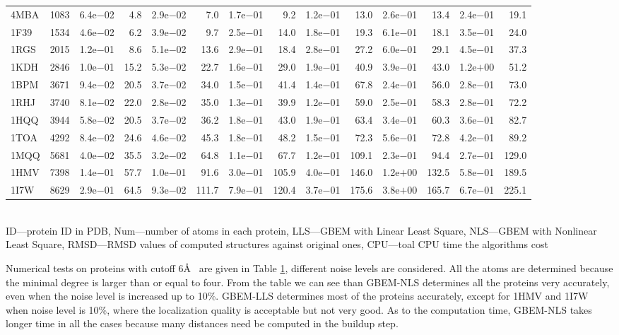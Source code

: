 \documentclass[a4paper,12pt]{article}
\begin{document}
\begin{table}[htb!]
{\begin{tabular}{lrrrrrrrrrrrrr}
  4MBA & 1083 & 6.4e$-$02 &  4.8 & 2.9e$-$02 &   7.0 & 1.7e$-$01 &   9.2 & 1.2e$-$01&  13.0 & 2.6e$-$01 &  13.4 & 2.4e$-$01&  19.1  \\
  1F39 & 1534 & 4.6e$-$02 &  6.2 & 3.9e$-$02 &   9.7 & 2.5e$-$01 &  14.0 & 1.8e$-$01&  19.3 & 6.1e$-$01 &  18.1 & 3.5e$-$01&  24.0  \\
  1RGS & 2015 & 1.2e$-$01 &  8.6 & 5.1e$-$02 &  13.6 & 2.9e$-$01 &  18.4 & 2.8e$-$01&  27.2 & 6.0e$-$01 &  29.1 & 4.5e$-$01&  37.3  \\
  1KDH & 2846 & 1.0e$-$01 & 15.2 & 5.3e$-$02 &  22.7 & 1.6e$-$01 &  29.0 & 1.9e$-$01&  40.9 & 3.9e$-$01 &  43.0 & 1.2e$+$00&  51.2  \\
  1BPM & 3671 & 9.4e$-$02 & 20.5 & 3.7e$-$02 &  34.0 & 1.5e$-$01 &  41.4 & 1.4e$-$01&  67.8 & 2.4e$-$01 &  56.0 & 2.8e$-$01&  73.0  \\
  1RHJ & 3740 & 8.1e$-$02 & 22.0 & 2.8e$-$02 &  35.0 & 1.3e$-$01 &  39.9 & 1.2e$-$01&  59.0 & 2.5e$-$01 &  58.3 & 2.8e$-$01&  72.2  \\
  1HQQ & 3944 & 5.8e$-$02 & 20.5 & 3.7e$-$02 &  36.2 & 1.8e$-$01 &  43.0 & 1.9e$-$01&  63.4 & 3.4e$-$01 &  60.3 & 3.6e$-$01&  82.7  \\
  1TOA & 4292 & 8.4e$-$02 & 24.6 & 4.6e$-$02 &  45.3 & 1.8e$-$01 &  48.2 & 1.5e$-$01&  72.3 & 5.6e$-$01 &  72.8 & 4.2e$-$01&  89.2  \\
  1MQQ & 5681 & 4.0e$-$02 & 35.5 & 3.2e$-$02 &  64.8 & 1.1e$-$01 &  67.7 & 1.2e$-$01& 109.1 & 2.3e$-$01 &  94.4 & 2.7e$-$01& 129.0  \\
  1HMV & 7398 & 1.4e$-$01 & 57.7 & 1.0e$-$01 &  91.6 & 3.0e$-$01 & 105.9 & 4.0e$-$01& 146.0 & 1.2e$+$00 & 132.5 & 5.8e$-$01& 189.5  \\
  1I7W & 8629 & 2.9e$-$01 & 64.5 & 9.3e$-$02 & 111.7 & 7.9e$-$01 & 120.4 & 3.7e$-$01& 175.6 & 3.8e$+$00 & 165.7 & 6.7e$-$01& 225.1  \\
  \toprule
\end{tabular}\\[-4mm]
\label{table:cut6}                                                                  \bl ID---protein ID in PDB, Num---number of atoms in each protein, LLS---GBEM with Linear Least Square, NLS---GBEM with Nonlinear Least Square, RMSD---RMSD values of computed structures against original ones, CPU---toal CPU time the algorithms cost
\el
}                                                                                          \end{table}

Numerical tests on proteins with cutoff 6\AA~ are given in Table \ref{table:cut6}, different noise levels are considered. All the atoms are determined because the minimal degree is larger than or equal to four. From the table we can see than GBEM-NLS determines all the proteins very accurately, even when the noise level is increased up to 10\%. GBEM-LLS determines most of the proteins accurately, except for 1HMV and 1I7W when noise level is 10\%, where the localization quality is acceptable but not very good. As to the computation time, GBEM-NLS takes longer time in all the cases because many distances need be computed in the buildup step.
\end{document}
